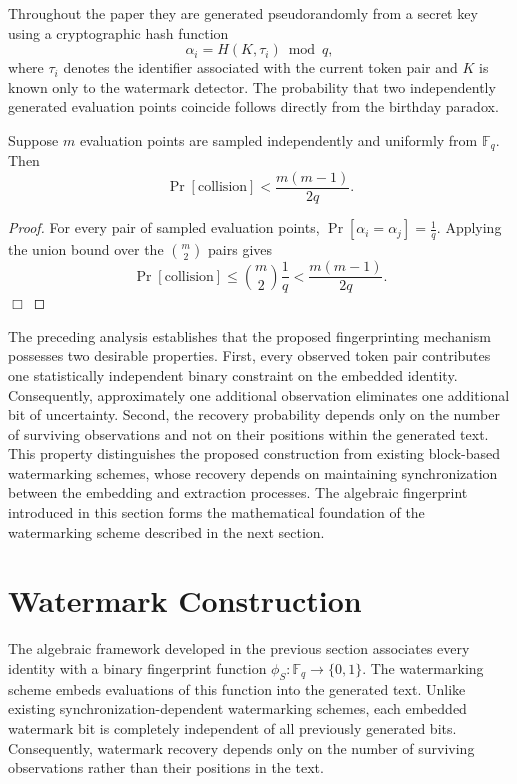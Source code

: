 \documentclass[a4paper,11pt]{llncs}
\begin{document}
Throughout the paper they are generated pseudorandomly from a secret key
using a cryptographic hash function
\[
\alpha_i
=
H(K,\tau_i)\bmod q,
\]
where $\tau_i$ denotes the identifier associated with the current token
pair and $K$ is known only to the watermark detector.
The probability that two independently generated evaluation points
coincide follows directly from the birthday paradox.
%
\begin{proposition}
Suppose $m$ evaluation points are sampled independently and uniformly from
$\mathbb F_q$. Then
\[
\Pr[\mathrm{collision}]
<
\frac{m(m-1)}{2q}.
\]
\end{proposition}
%
\begin{proof}
For every pair of sampled evaluation points,
$\Pr[\alpha_i=\alpha_j]
=
\frac1q.$
Applying the union bound over the $\binom{m}{2}$ pairs gives
\[
\Pr[\mathrm{collision}]
\le
\binom{m}{2}\frac1q
<
\frac{m(m-1)}{2q}.
\]
\hfill$\Box$
\end{proof}

The preceding analysis establishes that the proposed fingerprinting
mechanism possesses two desirable properties.
%
First, every observed token pair contributes one statistically
independent binary constraint on the embedded identity.
Consequently, approximately one additional observation eliminates one
additional bit of uncertainty.
%
Second, the recovery probability depends only on the number of surviving
observations and not on their positions within the generated text.
This property distinguishes the proposed construction from existing
block-based watermarking schemes, whose recovery depends on maintaining
synchronization between the embedding and extraction processes.
%
The algebraic fingerprint introduced in this section forms the
mathematical foundation of the watermarking scheme described in the next
section.

\section{Watermark Construction}
\label{sec:construction}
The algebraic framework developed in the previous section associates
every identity with a binary fingerprint function
$\phi_S:\mathbb F_q\rightarrow\{0,1\}.$
The watermarking scheme embeds evaluations of this function into the
generated text. Unlike existing synchronization-dependent watermarking
schemes, each embedded watermark bit is completely independent of all
previously generated bits. Consequently, watermark recovery depends only
on the number of surviving observations rather than their positions in
the text.
\end{document}

